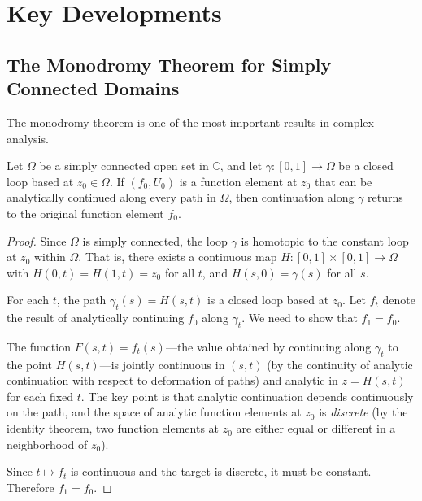 \section{Key Developments}

\subsection{The Monodromy Theorem for Simply Connected Domains}

The monodromy theorem is one of the most important results in complex analysis.

\begin{theorem}
\label{thm:monodromy}
Let $\Omega$ be a simply connected open set in $\mathbb{C}$, and let $\gamma \colon [0,1] \to \Omega$ be a closed loop based at $z_0 \in \Omega$. If $(f_0, U_0)$ is a function element at $z_0$ that can be analytically continued along every path in $\Omega$, then continuation along $\gamma$ returns to the original function element $f_0$.
\end{theorem}

\begin{proof}
Since $\Omega$ is simply connected, the loop $\gamma$ is homotopic to the constant loop at $z_0$ within $\Omega$. That is, there exists a continuous map $H \colon [0,1] \times [0,1] \to \Omega$ with $H(0,t) = H(1,t) = z_0$ for all $t$, and $H(s,0) = \gamma(s)$ for all $s$.

For each $t$, the path $\gamma_t(s) = H(s,t)$ is a closed loop based at $z_0$. Let $f_t$ denote the result of analytically continuing $f_0$ along $\gamma_t$. We need to show that $f_1 = f_0$.

The function $F(s,t) = f_t(s)$---the value obtained by continuing along $\gamma_t$ to the point $H(s,t)$---is jointly continuous in $(s,t)$ (by the continuity of analytic continuation with respect to deformation of paths) and analytic in $z = H(s,t)$ for each fixed $t$. The key point is that analytic continuation depends continuously on the path, and the space of analytic function elements at $z_0$ is \emph{discrete} (by the identity theorem, two function elements at $z_0$ are either equal or different in a neighborhood of $z_0$).

Since $t \mapsto f_t$ is continuous and the target is discrete, it must be constant. Therefore $f_1 = f_0$.
\end{proof}

